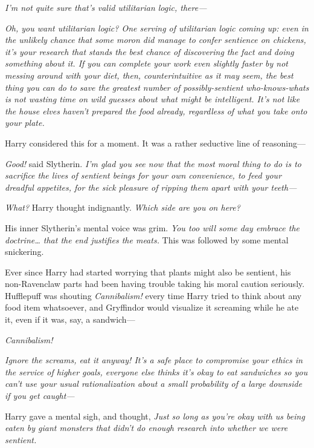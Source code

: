 \emph{I'm not quite sure that's valid utilitarian logic, there---}

\emph{Oh, you want utilitarian logic? One serving of utilitarian logic coming up: even in the unlikely chance that some moron \emph{did} manage to confer sentience on chickens, it's \emph{your} research that stands the best chance of discovering the fact and doing something about it. If you can complete your work even slightly faster by \emph{not} messing around with your diet, then, counterintuitive as it may seem, the \emph{best} thing you can do to save the greatest number of possibly-sentient who-knows-whats is \emph{not} wasting time on wild guesses about what might be intelligent. It's not like the house elves haven't prepared the food already, regardless of what you take onto your plate.}

Harry considered this for a moment. It was a rather seductive line of reasoning---

\emph{Good!} said Slytherin. \emph{I'm glad you see now that the most moral thing to do is to sacrifice the lives of sentient beings for your own convenience, to feed your dreadful appetites, for the sick pleasure of ripping them apart with your teeth---}

\emph{What?} Harry thought indignantly. \emph{Which side are you \emph{on} here?}

His inner Slytherin's mental voice was grim. \emph{You too will some day embrace the doctrine{\ldots} that the end justifies the meats.} This was followed by some mental snickering.

Ever since Harry had started worrying that plants might also be sentient, his non-Ravenclaw parts had been having trouble taking his moral caution seriously. Hufflepuff was shouting \emph{Cannibalism!} every time Harry tried to think about any food item whatsoever, and Gryffindor would visualize it screaming while he ate it, even if it was, say, a sandwich---

\emph{Cannibalism!}

\emph{}

\emph{Ignore the screams, eat it anyway! It's a safe place to compromise your ethics in the service of higher goals, everyone \emph{else} thinks it's okay to eat sandwiches so you can't use your usual rationalization about a small probability of a large downside if you get caught---}

Harry gave a mental sigh, and thought, \emph{Just so long as you're okay with \emph{us} being eaten by giant monsters that didn't do enough research into whether \emph{we} were sentient.}

